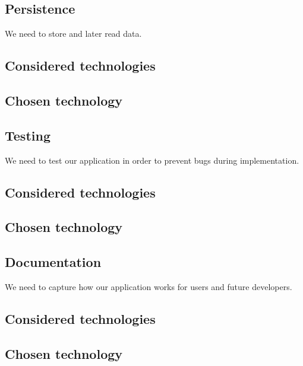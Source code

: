 \subsection{Persistence}
We need to store and later read data.
\subsection*{Considered technologies}

\subsubsection*{}

\subsubsection*{}

\subsection*{Chosen technology}

\subsection{Testing}
We need to test our application in order to prevent bugs during implementation.
\subsection*{Considered technologies}

\subsubsection*{}

\subsubsection*{}

\subsection*{Chosen technology}

\subsection{Documentation}
We need to capture how our application works for users and future developers.
\subsection*{Considered technologies}

\subsubsection*{}

\subsubsection*{}

\subsection*{Chosen technology}
